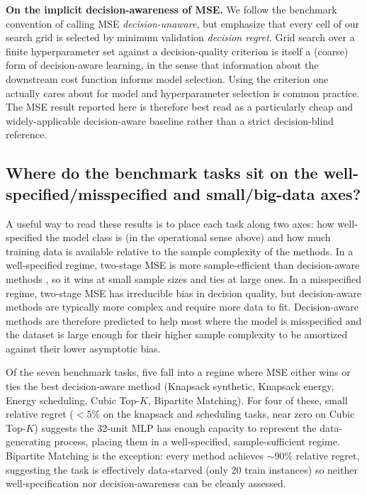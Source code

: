 \textbf{On the implicit decision-awareness of MSE.} We follow the benchmark convention of calling MSE \emph{decision-unaware}, but emphasize that every cell of our search grid is selected by minimum validation \emph{decision regret}. Grid search over a finite hyperparameter set against a decision-quality criterion is itself a (coarse) form of decision-aware learning, in the sense that information about the downstream cost function informs model selection. Using the criterion one actually cares about for model and hyperparameter selection is common practice. The MSE result reported here is therefore best read as a particularly cheap and widely-applicable decision-aware baseline rather than a strict decision-blind reference.

\subsection{Where do the benchmark tasks sit on the well-specified/misspecified and small/big-data axes?}

A useful way to read these results is to place each task along two axes: how well-specified the model class is (in the operational sense above) and how much training data is available relative to the sample complexity of the methods. In a well-specified regime, two-stage MSE is more sample-efficient than decision-aware methods \citep{elmachtoubDissectingImpactModel2025, huFastRatesContextual2022}, so it wins at small sample sizes and ties at large ones. In a misspecified regime, two-stage MSE has irreducible bias in decision quality, but decision-aware methods are typically more complex and require more data to fit. Decision-aware methods are therefore predicted to help most where the model is misspecified and the dataset is large enough for their higher sample complexity to be amortized against their lower asymptotic bias.

Of the seven benchmark tasks, five fall into a regime where MSE either wins or ties the best decision-aware method (Knapsack synthetic, Knapsack energy, Energy scheduling, Cubic Top-$K$, Bipartite Matching). For four of these, small relative regret ($<5\%$ on the knapsack and scheduling tasks, near zero on Cubic Top-$K$) suggests the 32-unit MLP has enough capacity to represent the data-generating process, placing them in a well-specified, sample-sufficient regime. Bipartite Matching is the exception: every method achieves $\sim$90\% relative regret, suggesting the task is effectively data-starved (only 20 train instances) so neither well-specification nor decision-awareness can be cleanly assessed.

